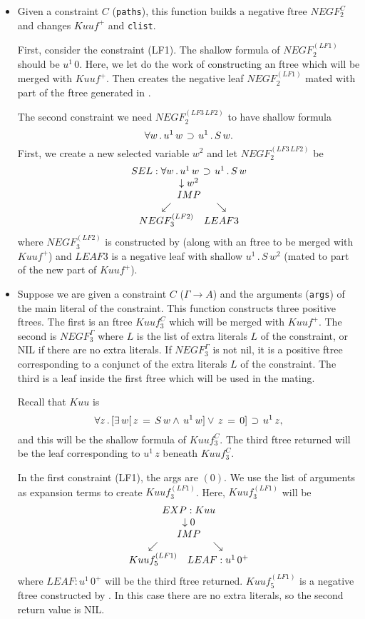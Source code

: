 \begin{enumerate}
\begin{itemize}
\item {\bf {}}
Given a constraint $C$ (\verb+paths+), this function builds
a negative ftree $NEGF_2^C$ and changes $Kuuf^+$ and \verb+clist+.

First, consider the constraint (LF1).  The shallow formula of
$NEGF_2^{(LF1)}$ should be $u^1\, 0$.  Here, we let
 do the work
of constructing an ftree which will be merged with $Kuuf^+$.
Then  creates
the negative leaf $NEGF_2^{(LF1)}$ mated with part of
the ftree generated in .

The second constraint we need $NEGF_2^{(LF3\, LF2)}$ to have shallow
formula
$$\forall w \, . \, u^1\, w\,\mathbin{\supset}\, u^1\, . \, S\, w.$$
First, we create a new selected variable $w^2$ and let $NEGF_2^{(LF3\, LF2)}$
be 
$${{\begin{array}[t]{c}SEL: \forall w \, . \, u^1\, w\,\mathbin{\supset}\, u^1\, . \, S\, w \\ \begin{array}[t]{c} \downarrow w^2 \\ {{\begin{array}[t]{c}IMP \\ \begin{array}[t]{cc} \swarrow & \searrow \\ NEGF_3^{(LF2)} & LEAF3 \end{array}\end{array}}}\end{array}\end{array}}}$$
where $NEGF_3^{(LF2)}$ is constructed by 
(along with an ftree to be merged with $Kuuf^+$)
and $LEAF3$ is a negative leaf with shallow $u^1\, . \, S\, w^2$
(mated to part of the new part of $Kuuf^+$).

\item {\bf {}}  Suppose we are
given a constraint $C$ ($\Gamma\rightarrow A$) and the arguments (\verb+args+) of the main literal of the constraint.
This function constructs three positive ftrees.  The first is an ftree $Kuuf_3^C$
which will be merged with $Kuuf^+$.  The second is $NEGF_3^\Gamma$ where $L$
is the list of extra literals $L$ of the constraint, or NIL if there are no extra
literals.  If $NEGF_3^\Gamma$ is not nil, it is
a positive ftree corresponding to a conjunct of the extra literals $L$ of the constraint.
The third is a leaf inside the first ftree which will be used in the mating.

Recall that $Kuu$ is
$$\forall z\, .\, [\exists \,w [ \,z \,= \,S \,w \land \,u^1 \,w] \lor \,z \,= \,0]
\,\mathbin{\supset}\, u^1\, z,$$
and this will be the shallow formula of $Kuuf_3^C$.
The third ftree returned will be the leaf corresponding to $u^1\, z$
beneath $Kuuf_3^C$.

In the first constraint (LF1), the args are $(0)$.  We use the list of
arguments as expansion terms to create $Kuuf_3^{(LF1)}$.  Here, $Kuuf_3^{(LF1)}$ will be
$${{\begin{array}[t]{c}EXP: Kuu \\ \begin{array}[t]{c} \downarrow 0 \\ {{\begin{array}[t]{c}IMP \\ \begin{array}[t]{cc} \swarrow & \searrow \\ Kuuf_5^{(LF1)} & LEAF:u^1\, 0^+ \end{array}\end{array}}}\end{array}\end{array}}}$$
where $LEAF:u^1\, 0^+$ will be the third ftree returned.
$Kuuf_5^{(LF1)}$ is a negative ftree constructed by
.
In this case there are no extra literals, so the second return value is NIL.


\end{itemize}
\end{enumerate}
